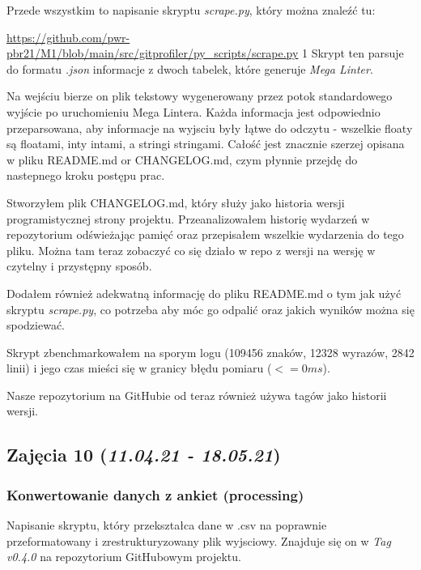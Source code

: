 \documentclass[graybox]{svmult}
\begin{document}
Przede wszystkim to napisanie skryptu \textit{scrape.py}, który można znaleźć tu:

\href{scrape.py}{\url{https://github.com/pwr-pbr21/M1/blob/main/src/gitprofiler/py_scripts/scrape.py}}
1
Skrypt ten parsuje do formatu \emph{.json} informacje z dwoch tabelek, które generuje \emph{Mega Linter}.

Na wejściu bierze on plik tekstowy wygenerowany przez potok standardowego wyjście po uruchomieniu Mega Lintera. Każda informacja jest odpowiednio przeparsowana, aby informacje na wyjsciu były łątwe do odczytu - wszelkie floaty są floatami, inty intami, a stringi stringami. Całość jest znacznie szerzej opisana w pliku README.md or CHANGELOG.md, czym płynnie przejdę do nastepnego kroku postępu prac.

Stworzyłem plik CHANGELOG.md, który służy jako historia wersji programistycznej strony projektu. Przeanalizowałem historię wydarzeń w repozytorium odświeżając pamięć oraz przepisałem wszelkie wydarzenia do tego pliku. Można tam teraz zobaczyć co się działo w repo z wersji na wersję w czytelny i przystępny sposób.

Dodałem również adekwatną informację do pliku README.md o tym jak użyć skryptu \emph{scrape.py}, co potrzeba aby móc go odpalić oraz jakich wyników można się spodziewać.

Skrypt zbenchmarkowałem na sporym logu (109456 znaków, 12328 wyrazów, 2842 linii) i jego czas mieści się w granicy błędu pomiaru ($<= 0ms$).

Nasze repozytorium na GitHubie od teraz również używa tagów jako historii wersji.

\subsection{Zajęcia 10 (\emph{11.04.21 - 18.05.21})}

\subsubsection{Konwertowanie danych z ankiet (processing)}

Napisanie skryptu, który przekształca dane w .csv na poprawnie przeformatowany i zrestrukturyzowany plik wyjsciowy. Znajduje się on w \emph{Tag v0.4.0} na repozytorium GitHubowym projektu. 
\end{document}
